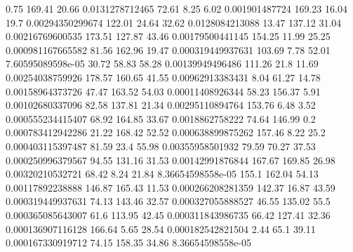 0.75 169.41 20.66 0.0131278712465
72.61 8.25 6.02 0.001901487724
169.23 16.04 19.7 0.00294350299674
122.01 24.64 32.62 0.0128084213088
13.47 137.12 31.04 0.00216769600535
173.51 127.87 43.46 0.00179500441145
154.25 11.99 25.25 0.000981167665582
81.56 162.96 19.47 0.000319449937631
103.69 7.78 52.01 7.60595089598e-05
30.72 58.83 58.28 0.00139949496486
111.26 21.8 11.69 0.00254038759926
178.57 160.65 41.55 0.00962913383431
8.04 61.27 14.78 0.00158964373726
47.47 163.52 54.03 0.00011408926344
58.23 156.37 5.91 0.00102680337096
82.58 137.81 21.34 0.00295110894764
153.76 6.48 3.52 0.000555234415407
68.92 164.85 33.67 0.0018862758222
74.64 146.99 0.2 0.000783412942286
21.22 168.42 52.52 0.000638899875262
157.46 8.22 25.2 0.000403115397487
81.59 23.4 55.98 0.00355958501932
79.59 70.27 37.53 0.000250996379567
94.55 131.16 31.53 0.00142991876844
167.67 169.85 26.98 0.00320210532721
68.42 8.24 21.84 8.36654598558e-05
155.1 162.04 54.13 0.00117892238888
146.87 165.43 11.53 0.000266208281359
142.37 16.87 43.59 0.000319449937631
74.13 143.46 32.57 0.000327055888527
46.55 135.02 55.5 0.000365085643007
61.6 113.95 42.45 0.000311843986735
66.42 127.41 32.36 0.000136907116128
166.64 5.65 28.54 0.000182542821504
2.44 65.1 39.11 0.000167330919712
74.15 158.35 34.86 8.36654598558e-05
